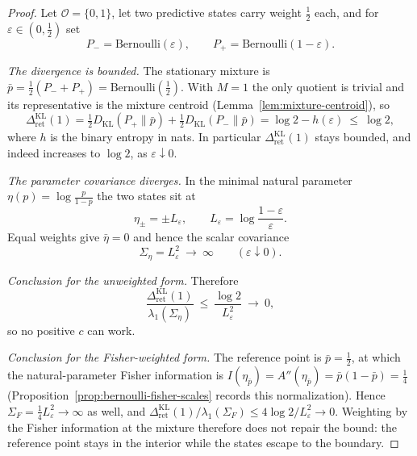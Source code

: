 \documentclass[12pt]{article}
\theoremstyle{definition}
\newcommand{\RetKL}{\Delta_{\mathrm{ret}}^{\mathrm{KL}}}
\begin{document}
\begin{proof}
Let $\mathcal O=\{0,1\}$, let two predictive states carry weight $\tfrac12$
each, and for $\varepsilon\in(0,\tfrac12)$ set
\[
P_-=\mathrm{Bernoulli}(\varepsilon),
\qquad
P_+=\mathrm{Bernoulli}(1-\varepsilon).
\]

\emph{The divergence is bounded.}  The stationary mixture is
$\bar p=\tfrac12(P_-+P_+)=\mathrm{Bernoulli}(\tfrac12)$.  With $M=1$ the only
quotient is trivial and its representative is the mixture centroid
(Lemma~\ref{lem:mixture-centroid}), so
\[
\RetKL(1)
=
\tfrac12D_{\mathrm{KL}}(P_+\|\bar p)+\tfrac12D_{\mathrm{KL}}(P_-\|\bar p)
=
\log2-h(\varepsilon)
\ \le\
\log2,
\]
where $h$ is the binary entropy in nats.  In particular $\RetKL(1)$ stays
bounded, and indeed increases to $\log2$, as $\varepsilon\downarrow0$.

\emph{The parameter covariance diverges.}  In the minimal natural parameter
$\eta(p)=\log\frac{p}{1-p}$ the two states sit at
\[
\eta_\pm=\pm L_\varepsilon,
\qquad
L_\varepsilon=\log\frac{1-\varepsilon}{\varepsilon}.
\]
Equal weights give $\bar\eta=0$ and hence the scalar covariance
\[
\Sigma_\eta=L_\varepsilon^2\ \longrightarrow\ \infty
\qquad(\varepsilon\downarrow0).
\]

\emph{Conclusion for the unweighted form.}  Therefore
\[
\frac{\RetKL(1)}{\lambda_1(\Sigma_\eta)}
\ \le\
\frac{\log2}{L_\varepsilon^2}
\ \longrightarrow\ 0 ,
\]
so no positive $c$ can work.

\emph{Conclusion for the Fisher-weighted form.}  The reference point is
$\bar p=\tfrac12$, at which the natural-parameter Fisher information is
$I(\eta_{\bar p})=A''(\eta_{\bar p})=\bar p(1-\bar p)=\tfrac14$
(Proposition~\ref{prop:bernoulli-fisher-scales} records this normalization).
Hence $\Sigma_F=\tfrac14L_\varepsilon^2\to\infty$ as well, and
$\RetKL(1)/\lambda_1(\Sigma_F)\le 4\log2/L_\varepsilon^2\to0$.  Weighting by the
Fisher information at the mixture therefore does not repair the bound: the
reference point stays in the interior while the states escape to the boundary.
\end{proof}
\end{document}
